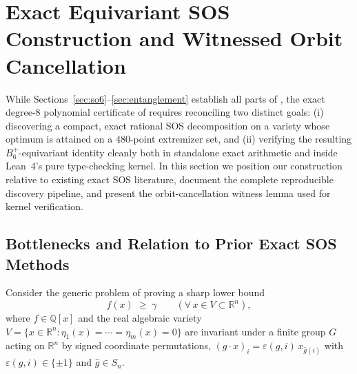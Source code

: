 \documentclass[11pt,a4paper]{article}
\theoremstyle{plain}
\theoremstyle{definition}
\theoremstyle{remark}
\newcommand{\R}{\mathbb{R}}
\newcommand{\Q}{\mathbb{Q}}
\newcommand{\Bplus}{B_6^+}
\begin{document}
\FloatBarrier

\section{Exact Equivariant SOS Construction and Witnessed Orbit Cancellation}
\label{sec:methodology}

While Sections~\ref{sec:so6}--\ref{sec:entanglement} establish all parts of , the exact degree-$8$ polynomial certificate of  requires reconciling two distinct goals: (i) discovering a compact, exact rational SOS decomposition on a variety whose optimum is attained on a $480$-point extremizer set, and (ii) verifying the resulting $\Bplus$-equivariant identity cleanly both in standalone exact arithmetic and inside Lean~4's pure type-checking kernel. In this section we position our construction relative to existing exact SOS literature, document the complete reproducible discovery pipeline, and present the orbit-cancellation witness lemma used for kernel verification.

\subsection{Bottlenecks and Relation to Prior Exact SOS Methods}

Consider the generic problem of proving a sharp lower bound
\begin{equation}
  \label{eq:gen-pop}
  f(x) \;\ge\; \gamma \qquad (\forall\, x \in V \subset \R^n),
\end{equation}
where $f \in \Q[x]$ and the real algebraic variety $V = \{x \in \R^n : \eta_1(x) = \cdots = \eta_m(x) = 0\}$ are invariant under a finite group $G$ acting on $\R^n$ by signed coordinate permutations, $(g \cdot x)_i = \varepsilon(g,i)\, x_{\hat{g}(i)}$ with $\varepsilon(g,i) \in \{\pm 1\}$ and $\hat{g} \in S_n$.
\end{document}
